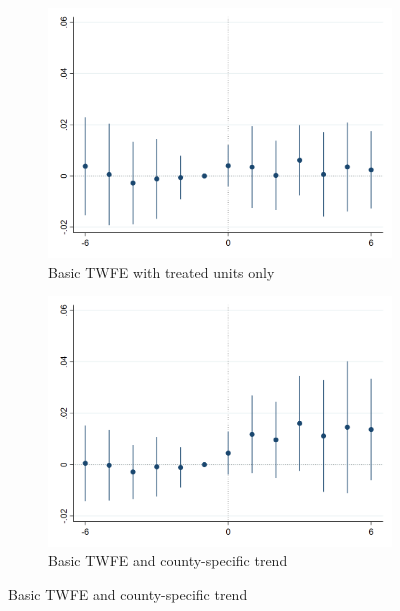     \begin{figure}[h!] \centering
        \caption{Dynamic effects around selected minimum wage events: rents}
        \label{fig:event_study_main}
        \begin{subfigure}{0.5\textwidth} \centering
            \includegraphics[width=0.95\linewidth]{analysis/event_study_exploration/output/last_rentpsqft_sfcc_zfe_w6.png}
            \caption{Basic TWFE with treated units only} \label{fig:event_study_treated}
        \end{subfigure}%
        \begin{subfigure}{0.5\textwidth} \centering
            \includegraphics[width=0.95\linewidth]{analysis/event_study_exploration/output/last_rentpsqft_sfcc_zfe_w6_county-trend.png}
            \caption{Basic TWFE and county-specific trend} \label{fig:event_study_treated_county-trends}

\end{subfigure}
\end{figure}
